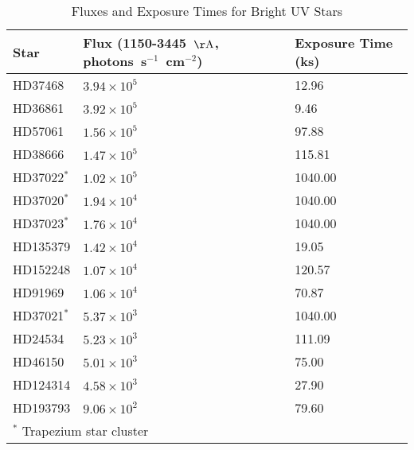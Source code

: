 \begin{table*}
\caption{Fluxes and Exposure Times for Bright UV Stars\label{tab:star_fluxes}}
\begin{center}
\begin{tabular}{lll}
\hline
\hline
Star & Flux (1150-3445~${\rm \AA}$, photons~s$^{-1}$~cm$^{-2}$) & Exposure Time (ks) \\
\hline
HD37468 & $3.94 \times 10^5$ & 12.96 \\
HD36861 & $3.92 \times 10^5$ & 9.46 \\
HD57061 & $1.56 \times 10^5$ & 97.88 \\
HD38666 & $1.47 \times 10^5$ & 115.81 \\
HD37022$^*$ & $1.02 \times 10^5$ & 1040.00 \\
HD37020$^*$ & $1.94 \times 10^4$ & 1040.00 \\
HD37023$^*$ & $1.76 \times 10^4$ & 1040.00 \\
HD135379 & $1.42 \times 10^4$ & 19.05 \\
HD152248 & $1.07 \times 10^4$ & 120.57 \\
HD91969 & $1.06 \times 10^4$ & 70.87 \\
HD37021$^*$ & $5.37 \times 10^3$ & 1040.00 \\
HD24534 & $5.23 \times 10^3$ & 111.09 \\
HD46150 & $5.01 \times 10^3$ & 75.00 \\
HD124314 & $4.58 \times 10^3$ & 27.90 \\
HD193793 & $9.06 \times 10^2$ & 79.60 \\
\hline
\multicolumn{3}{p{.6\textwidth}}{$^*$ Trapezium star cluster}
\end{tabular}
\end{center}
\end{table*}
